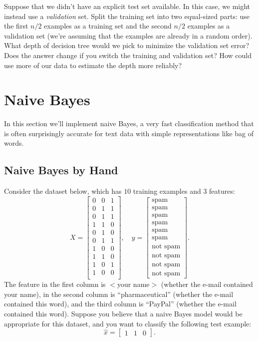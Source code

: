 \documentclass{article}
\def\blu#1{{\color{blu}#1}}
\begin{document}
Suppose that we didn't have an explicit test set available. In this case, we might instead use a \emph{validation} set. Split the training set into two equal-sized parts: use the first $n/2$ examples as a training set and the second $n/2$ examples as a validation set (we're assuming that the examples are already in a random order). \blu{What depth of decision tree would we pick to minimize the validation set error? Does the answer change if you switch the training and validation set? How could use more of our data to  estimate the depth more reliably?}


\section{Naive Bayes}

In this section we'll implement naive Bayes, a very fast classification method that is often surprisingly accurate for text data with simple representations like bag of words.



\subsection{Naive Bayes by Hand}

Consider the dataset below, which has $10$ training examples and $3$ features:
\[
X = \begin{bmatrix}0 & 0 & 1\\0 & 1 & 1\\ 0 & 1 & 1\\ 1 & 1 & 0\\0 & 1 & 0\\0 & 1 & 1\\1 & 0 & 0\\1 & 1 & 0\\1 & 0 & 1\\1 & 0 & 0\\\end{bmatrix}, \quad y = \begin{bmatrix}\text{spam}\\\text{spam}\\\text{spam}\\\text{spam}\\\text{spam}\\\text{spam}\\\text{not spam}\\\text{not spam}\\\text{not spam}\\\text{not spam}\end{bmatrix}.
\]
The feature in the first column is $<$your name$>$ (whether the e-mail contained your name), in the second column is ``pharmaceutical'' (whether the e-mail contained this word), and the third column is ``PayPal'' (whether the e-mail contained this word).
Suppose you believe that a naive Bayes model would be appropriate for this dataset, and you want to classify the following test example:
\[
\hat{x} = \begin{bmatrix}1 & 1 & 0\end{bmatrix}.
\]
\end{document}

